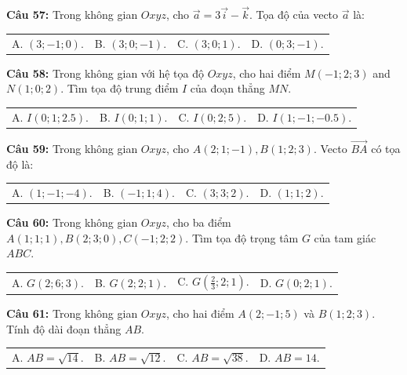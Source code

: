 \documentclass[12pt]{article}
\begin{document}
	\vspace{2mm}
	\noindent \textbf{Câu 57:} Trong không gian $Oxyz$, cho $\vec{a} = 3\vec{i} - \vec{k}$. Tọa độ của vecto $\vec{a}$ là: \\
	\noindent
	\begin{tabular}{p{} p{} p{} p{}}
		A. $(3; -1; 0)$. & B. $(3; 0; -1)$. & C. $(3; 0; 1)$. & D. $(0; 3; -1)$.
	\end{tabular}
	
	\vspace{2mm}
	\noindent \textbf{Câu 58:} Trong không gian với hệ tọa độ $Oxyz$, cho hai điểm $M(-1; 2; 3)$ and $N(1; 0; 2)$. Tìm tọa độ trung điểm $I$ của đoạn thẳng $MN$. \\
	\noindent
	\begin{tabular}{p{} p{} p{} p{}}
		A. $I(0; 1; 2.5)$. & B. $I(0; 1; 1)$. & C. $I(0; 2; 5)$. & D. $I(1; -1; -0.5)$.
	\end{tabular}
	
	\vspace{2mm}
	\noindent \textbf{Câu 59:} Trong không gian $Oxyz$, cho $A(2; 1; -1), B(1; 2; 3)$. Vecto $\vec{BA}$ có tọa độ là: \\
	\noindent
	\begin{tabular}{p{} p{} p{} p{}}
		A. $(1; -1; -4)$. & B. $(-1; 1; 4)$. & C. $(3; 3; 2)$. & D. $(1; 1; 2)$.
	\end{tabular}
	
	\vspace{2mm}
	\noindent \textbf{Câu 60:} Trong không gian $Oxyz$, cho ba điểm $A(1; 1; 1), B(2; 3; 0), C(-1; 2; 2)$. Tìm tọa độ trọng tâm $G$ của tam giác $ABC$. \\
	\noindent
	\begin{tabular}{p{} p{} p{} p{}}
		A. $G(2; 6; 3)$. & B. $G(2; 2; 1)$. & C. $G\left(\frac{2}{3}; 2; 1\right)$. & D. $G(0; 2; 1)$.
	\end{tabular}
	
	\vspace{2mm}
	\noindent \textbf{Câu 61:} Trong không gian $Oxyz$, cho hai điểm $A(2; -1; 5)$ và $B(1; 2; 3)$. Tính độ dài đoạn thẳng $AB$. \\
	\noindent
	\begin{tabular}{p{} p{} p{} p{}}
		A. $AB = \sqrt{14}$. & B. $AB = \sqrt{12}$. & C. $AB = \sqrt{38}$. & D. $AB = 14$.
	\end{tabular}
	
\end{document}
